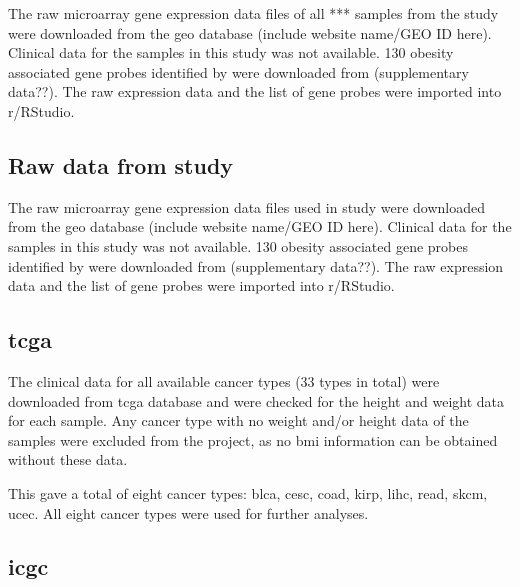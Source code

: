 
The raw microarray gene expression data files of all *** samples from the  \citet{Fuentes-Mattei2014} study were downloaded from the \gls{geo} database (include website name/GEO ID here).
Clinical data for the samples in this study was not available.
130 obesity associated gene probes identified by \citet{Fuentes-Mattei2014} were downloaded from (supplementary data??).
The raw expression data and the list of gene probes were imported into \gls{r}/RStudio.

\subsection{Raw data from \citet{Gatza2010a} study}
\label{sub:gatzarawdat}


The raw microarray gene expression data files used in  \citet{Gatza2010a} study were downloaded from the \gls{geo} database (include website name/GEO ID here).
Clinical data for the samples in this study was not available.
130 obesity associated gene probes identified by \citet{Gatza2010a} were downloaded from (supplementary data??).
The raw expression data and the list of gene probes were imported into \gls{r}/RStudio.

\subsection{\gls{tcga}}
\label{subsec:tcga}

The clinical data for all available cancer types (33 types in total) were downloaded from \gls{tcga} database and were checked for the height and weight data for each sample.
Any cancer type with no weight and/or height data of the samples were excluded from the project, as no \gls{bmi} information can be obtained without these data.

This gave a total of eight cancer types: \gls{blca}, \gls{cesc}, \gls{coad}, \gls{kirp}, \gls{lihc}, \gls{read}, \gls{skcm}, \gls{ucec}.
All eight cancer types were used for further analyses.

\subsection{\gls{icgc}}
\label{subsec:icgc}

